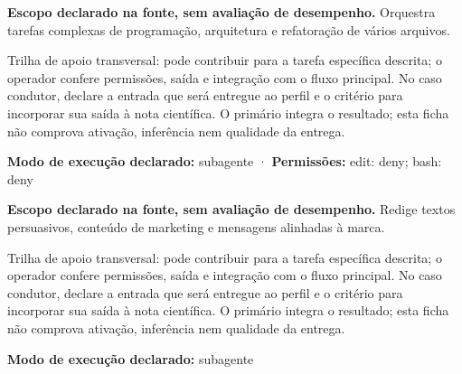 
\begin{descricao}
\textbf{Escopo declarado na fonte, sem avaliação de desempenho.}
Orquestra tarefas complexas de programação, arquitetura e refatoração de vários arquivos.
\end{descricao}

\begin{funcao}
Trilha de apoio transversal: pode contribuir para a tarefa específica descrita; o operador confere permissões, saída e integração com o fluxo principal. No caso condutor, declare a entrada que será entregue ao perfil e o critério para incorporar sua saída à nota científica. O primário integra o resultado; esta ficha não comprova ativação, inferência nem qualidade da entrega.
\end{funcao}

\begin{arquitetura}
\textbf{Modo de execução declarado:} subagente · \textbf{Permissões:} edit: deny; bash: deny
\end{arquitetura}


\begin{descricao}
\textbf{Escopo declarado na fonte, sem avaliação de desempenho.}
Redige textos persuasivos, conteúdo de marketing e mensagens alinhadas à marca.
\end{descricao}

\begin{funcao}
Trilha de apoio transversal: pode contribuir para a tarefa específica descrita; o operador confere permissões, saída e integração com o fluxo principal. No caso condutor, declare a entrada que será entregue ao perfil e o critério para incorporar sua saída à nota científica. O primário integra o resultado; esta ficha não comprova ativação, inferência nem qualidade da entrega.
\end{funcao}

\begin{arquitetura}
\textbf{Modo de execução declarado:} subagente
\end{arquitetura}

